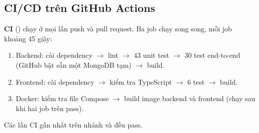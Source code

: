 \documentclass[11pt, a4paper]{article}
\begin{document}
\subsection{CI/CD trên GitHub Actions}
\textbf{CI} () chạy ở mọi lần push và pull request. Ba job chạy song song, mỗi job khoảng 45 giây:
\begin{enumerate}
  \item Backend: cài dependency $\rightarrow$ lint $\rightarrow$ 43 unit test $\rightarrow$ 30 test end-to-end (GitHub bật sẵn một MongoDB tạm) $\rightarrow$ build.
  \item Frontend: cài dependency $\rightarrow$ kiểm tra TypeScript $\rightarrow$ 6 test $\rightarrow$ build.
  \item Docker: kiểm tra file Compose $\rightarrow$ build image backend và frontend (chạy sau khi hai job trên pass).
\end{enumerate}
Các lần CI gần nhất trên nhánh  và  đều pass.
\end{document}

